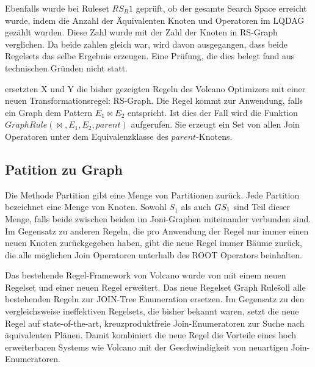 Ebenfalls wurde bei Ruleset $RS_B1$ geprüft, ob der gesamte Search Space erreicht wurde, indem die Anzahl der Äquivalenten Knoten und Operatoren im LQDAG gezählt wurden. Diese Zahl wurde mit der Zahl der Knoten in RS-Graph verglichen. Da beide zahlen gleich war, wird davon ausgegangen, dass beide Regelsets das selbe Ergebnis erzeugen. Eine Prüfung, die dies belegt fand aus technischen Gründen nicht statt.






ersetzten X und Y die bisher gezeigten Regeln des Volcano Optimizers mit einer neuen Transformationsregel: RS-Graph. Die Regel kommt zur Anwendung, falls ein Graph dem Pattern $E_1 \Join E_2$ entspricht. Ist dies der Fall wird die Funktion $GraphRule(\Join, E_1, E_2, parent)$ aufgerufen. Sie erzeugt ein Set von allen Join Operatoren unter dem Equivalenzklasse des $parent$-Knotens.




\subsubsection{}



\subsection{Patition zu Graph}



Die Methode Partition gibt eine Menge von Partitionen zurück. Jede Partition bezeichnet eine Menge von Knoten. Sowohl $S_1$ als auch $G\\S_1$ sind Teil dieser Menge, falls beide zwischen beiden im Joni-Graphen miteinander verbunden sind. Im Gegensatz zu anderen Regeln, die pro Anwendung der Regel nur immer einen neuen Knoten zurückgegeben haben, gibt die neue Regel immer Bäume zurück, die alle möglichen Join Operatoren unterhalb des ROOT Operators beinhalten.





Das bestehende Regel-Framework von Volcano wurde von \cite{shanbhag2014optimizing} mit einem neuen Regelset und einer neuen Regel erweitert.  Das neue Regelset \"Graph Rule\" soll alle bestehenden Regeln zur JOIN-Tree Enumeration ersetzen. Im Gegensatz zu den vergleichsweise ineffektiven Regelsets, die bisher bekannt waren, setzt die neue Regel auf state-of-the-art, kreuzproduktfreie Join-Enumeratoren zur Suche nach äquivalenten Plänen. Damit kombiniert die neue Regel die Vorteile eines hoch erweiterbaren Systems wie Volcano mit der Geschwindigkeit von neuartigen Join-Enumeratoren.


